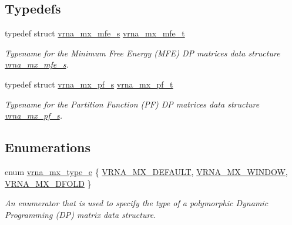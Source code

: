 \subsection*{Typedefs}
\begin{DoxyCompactItemize}
\item 
typedef struct \mbox{\hyperlink{group__dp__matrices_structvrna__mx__mfe__s}{vrna\+\_\+mx\+\_\+mfe\+\_\+s}} \mbox{\hyperlink{group__dp__matrices_gae5aef35d016475e758f619b7bcb534f9}{vrna\+\_\+mx\+\_\+mfe\+\_\+t}}
\begin{DoxyCompactList}\small\item\em Typename for the Minimum Free Energy (M\+FE) DP matrices data structure \mbox{\hyperlink{group__dp__matrices_structvrna__mx__mfe__s}{vrna\+\_\+mx\+\_\+mfe\+\_\+s}}. \end{DoxyCompactList}\item 
typedef struct \mbox{\hyperlink{group__dp__matrices_structvrna__mx__pf__s}{vrna\+\_\+mx\+\_\+pf\+\_\+s}} \mbox{\hyperlink{group__dp__matrices_ga68729ab3fed26bdd1806fa814f172fc1}{vrna\+\_\+mx\+\_\+pf\+\_\+t}}
\begin{DoxyCompactList}\small\item\em Typename for the Partition Function (PF) DP matrices data structure \mbox{\hyperlink{group__dp__matrices_structvrna__mx__pf__s}{vrna\+\_\+mx\+\_\+pf\+\_\+s}}. \end{DoxyCompactList}\end{DoxyCompactItemize}
\subsection*{Enumerations}
\begin{DoxyCompactItemize}
\item 
enum \mbox{\hyperlink{group__dp__matrices_ga6042ea1d58d01931e959791be6d89343}{vrna\+\_\+mx\+\_\+type\+\_\+e}} \{ \mbox{\hyperlink{group__dp__matrices_gga6042ea1d58d01931e959791be6d89343aafa2568956dab79595521e20c49a5f75}{V\+R\+N\+A\+\_\+\+M\+X\+\_\+\+D\+E\+F\+A\+U\+LT}}, 
\mbox{\hyperlink{group__dp__matrices_gga6042ea1d58d01931e959791be6d89343a2ea5d5947f6ec02544934b0ff2785e99}{V\+R\+N\+A\+\_\+\+M\+X\+\_\+\+W\+I\+N\+D\+OW}}, 
\mbox{\hyperlink{group__dp__matrices_gga6042ea1d58d01931e959791be6d89343ae656f8391445ff71bed8a597a0a19417}{V\+R\+N\+A\+\_\+\+M\+X\+\_\+D\+F\+O\+LD}}
 \}
\begin{DoxyCompactList}\small\item\em An enumerator that is used to specify the type of a polymorphic Dynamic Programming (DP) matrix data structure. \end{DoxyCompactList}\end{DoxyCompactItemize}
